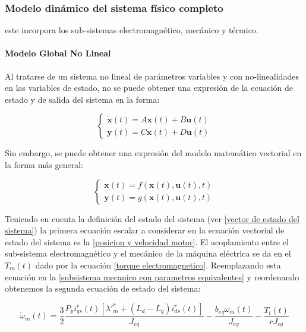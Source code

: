 \documentclass[a4paper, 10pt, onecolumn,journal]{ieeeconf}
\begin{document}

\subsubsection{\textbf{Modelo dinámico del sistema físico completo}} este incorpora los sub-sistemas electromagnético, mecánico y térmico.

\paragraph{\textbf{Modelo Global No Lineal}}
Al tratarse de un sistema no lineal de parámetros variables y con no-linealidades en las variables de estado, no se puede obtener una expresión
de la ecuación de estado y de salida del sistema en la forma:

\begin{equation*}
    \begin{cases}
        \mathbf{\dot{x}}(t) = A \mathbf{x}(t) + B \mathbf{u}(t)\\
        \mathbf{y}(t) = C \mathbf{x}(t) + D \mathbf{u}(t)
    \end{cases}
\end{equation*}

Sin embargo, se puede obtener una expresión del modelo matemático vectorial en la forma más general:

\begin{equation*}
    \begin{cases}
        \mathbf{\dot{x}}(t) = f(\mathbf{x}(t), \mathbf{u}(t), t)\\
        \mathbf{y}(t) = g(\mathbf{x}(t), \mathbf{u}(t), t)
    \end{cases}
\end{equation*}

Teniendo en cuenta la definición del estado del sistema (ver \cref{vector de estado del sistema}) la primera ecuación escalar a considerar en la ecuación vectorial de estado del sistema es la
\cref{posicion y velocidad motor}. El acoplamiento entre el sub-sistema electromagnético y el
mecánico de la máquina eléctrica se da en el $T_m(t)$ dado por la ecuación \cref{torque electromagnetico}.
Reemplazando esta ecuación en la \cref{subsistema mecanico con parametros equivalentes} y reordenando
obtenemos la segunda ecuación de estado del sistema:

\begin{equation}
    \dot{\omega}_m(t) = \frac{3}{2} \frac{P_p i^r_{qs}(t)\left[\lambda'^r_m + (L_d - L_q) i^r_{ds}(t) \right]}{J_{eq}} - \frac{b_{eq}\omega_m(t)}{J_{eq}} - \frac{T_l(t)}{r J_{eq}}
    \label{ecuacion de estado wm}
\end{equation}
\end{document}
